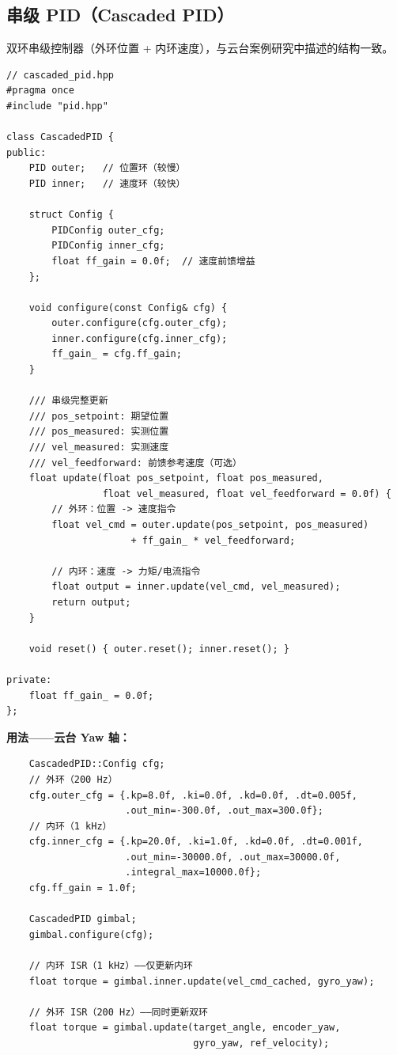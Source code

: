 \subsection{串级 PID（Cascaded PID）}

双环串级控制器（外环位置 + 内环速度），与云台案例研究中描述的结构一致。

\begin{verbatim}
// cascaded_pid.hpp
#pragma once
#include "pid.hpp"

class CascadedPID {
public:
    PID outer;   // 位置环（较慢）
    PID inner;   // 速度环（较快）

    struct Config {
        PIDConfig outer_cfg;
        PIDConfig inner_cfg;
        float ff_gain = 0.0f;  // 速度前馈增益
    };

    void configure(const Config& cfg) {
        outer.configure(cfg.outer_cfg);
        inner.configure(cfg.inner_cfg);
        ff_gain_ = cfg.ff_gain;
    }

    /// 串级完整更新
    /// pos_setpoint: 期望位置
    /// pos_measured: 实测位置
    /// vel_measured: 实测速度
    /// vel_feedforward: 前馈参考速度（可选）
    float update(float pos_setpoint, float pos_measured,
                 float vel_measured, float vel_feedforward = 0.0f) {
        // 外环：位置 -> 速度指令
        float vel_cmd = outer.update(pos_setpoint, pos_measured)
                      + ff_gain_ * vel_feedforward;

        // 内环：速度 -> 力矩/电流指令
        float output = inner.update(vel_cmd, vel_measured);
        return output;
    }

    void reset() { outer.reset(); inner.reset(); }

private:
    float ff_gain_ = 0.0f;
};
\end{verbatim}

\textbf{用法——云台 Yaw 轴：}
\begin{verbatim}
    CascadedPID::Config cfg;
    // 外环（200 Hz）
    cfg.outer_cfg = {.kp=8.0f, .ki=0.0f, .kd=0.0f, .dt=0.005f,
                     .out_min=-300.0f, .out_max=300.0f};
    // 内环（1 kHz）
    cfg.inner_cfg = {.kp=20.0f, .ki=1.0f, .kd=0.0f, .dt=0.001f,
                     .out_min=-30000.0f, .out_max=30000.0f,
                     .integral_max=10000.0f};
    cfg.ff_gain = 1.0f;

    CascadedPID gimbal;
    gimbal.configure(cfg);

    // 内环 ISR（1 kHz）——仅更新内环
    float torque = gimbal.inner.update(vel_cmd_cached, gyro_yaw);

    // 外环 ISR（200 Hz）——同时更新双环
    float torque = gimbal.update(target_angle, encoder_yaw,
                                 gyro_yaw, ref_velocity);
\end{verbatim}

